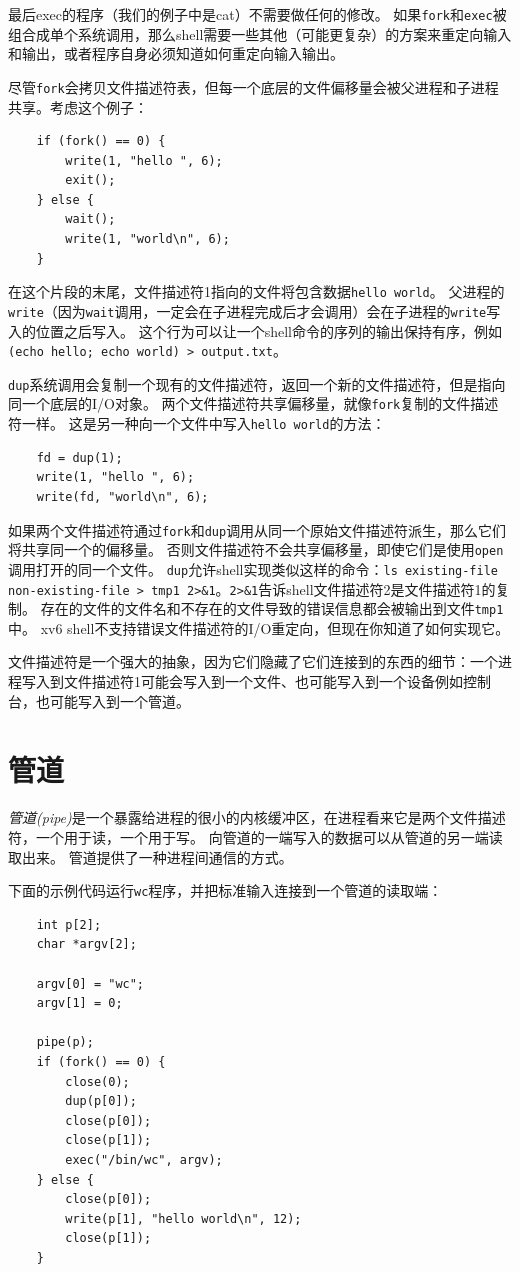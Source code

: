 最后exec的程序（我们的例子中是cat）不需要做任何的修改。
如果\texttt{fork}和\texttt{exec}被组合成单个系统调用，那么shell需要一些其他（可能更复杂）的方案来重定向输入和输出，或者程序自身必须知道如何重定向输入输出。

尽管\texttt{fork}会拷贝文件描述符表，但每一个底层的文件偏移量会被父进程和子进程共享。考虑这个例子：
\begin{lstlisting}
    if (fork() == 0) {
        write(1, "hello ", 6);
        exit();
    } else {
        wait();
        write(1, "world\n", 6);
    }
\end{lstlisting}
在这个片段的末尾，文件描述符1指向的文件将包含数据\texttt{hello world}。
父进程的\texttt{write}（因为\texttt{wait}调用，一定会在子进程完成后才会调用）会在子进程的\texttt{write}写入的位置之后写入。
这个行为可以让一个shell命令的序列的输出保持有序，例如\texttt{(echo hello; echo world) > output.txt}。

\texttt{dup}系统调用会复制一个现有的文件描述符，返回一个新的文件描述符，但是指向同一个底层的I/O对象。
两个文件描述符共享偏移量，就像\texttt{fork}复制的文件描述符一样。
这是另一种向一个文件中写入\texttt{hello world}的方法：
\begin{lstlisting}
    fd = dup(1);
    write(1, "hello ", 6);
    write(fd, "world\n", 6);
\end{lstlisting}

如果两个文件描述符通过\texttt{fork}和\texttt{dup}调用从同一个原始文件描述符派生，那么它们将共享同一个的偏移量。
否则文件描述符不会共享偏移量，即使它们是使用\texttt{open}调用打开的同一个文件。
\texttt{dup}允许shell实现类似这样的命令：\texttt{ls existing-file non-existing-file > tmp1 2>\&1}。\texttt{2>\&1}告诉shell文件描述符2是文件描述符1的复制。
存在的文件的文件名和不存在的文件导致的错误信息都会被输出到文件\texttt{tmp1}中。
xv6 shell不支持错误文件描述符的I/O重定向，但现在你知道了如何实现它。

文件描述符是一个强大的抽象，因为它们隐藏了它们连接到的东西的细节：一个进程写入到文件描述符1可能会写入到一个文件、也可能写入到一个设备例如控制台，也可能写入到一个管道。

\section*{管道}
\emph{管道(pipe)}是一个暴露给进程的很小的内核缓冲区，在进程看来它是两个文件描述符，一个用于读，一个用于写。
向管道的一端写入的数据可以从管道的另一端读取出来。
管道提供了一种进程间通信的方式。

下面的示例代码运行\texttt{wc}程序，并把标准输入连接到一个管道的读取端：
\begin{lstlisting}
    int p[2];
    char *argv[2];

    argv[0] = "wc";
    argv[1] = 0;

    pipe(p);
    if (fork() == 0) {
        close(0);
        dup(p[0]);
        close(p[0]);
        close(p[1]);
        exec("/bin/wc", argv);
    } else {
        close(p[0]);
        write(p[1], "hello world\n", 12);
        close(p[1]);
    }
\end{lstlisting}

